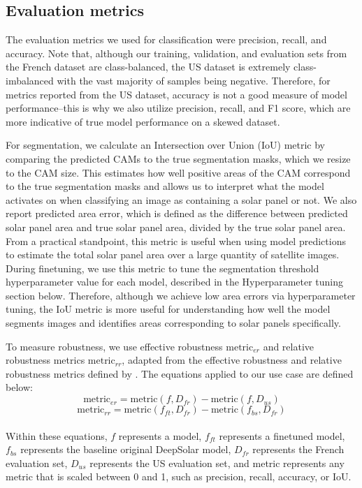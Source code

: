 \documentclass[10pt,twocolumn,letterpaper]{article}
\begin{document}
\subsection{Evaluation metrics}

The evaluation metrics we used for classification were precision, recall, and accuracy. Note that, although our training, validation, and evaluation sets from the French dataset are class-balanced, the US dataset is extremely class-imbalanced with the vast majority of samples being negative. Therefore, for metrics reported from the US dataset, accuracy is not a good measure of model performance--this is why we also utilize precision, recall, and F1 score, which are more indicative of true model performance on a skewed dataset. 

For segmentation, we calculate an Intersection over Union (IoU) metric by comparing the predicted CAMs to the true segmentation masks, which we resize to the CAM size. This estimates how well positive areas of the CAM correspond to the true segmentation masks and allows us to interpret what the model activates on when classifying an image as containing a solar panel or not. We also report predicted area error, which is defined as the difference between predicted solar panel area and true solar panel area, divided by the true solar panel area. From a practical standpoint, this metric is useful when using model predictions to estimate the total solar panel area over a large quantity of satellite images. During finetuning, we use this metric to tune the segmentation threshold hyperparameter value for each model, described in the Hyperparameter tuning section below. Therefore, although we achieve low area errors via hyperparameter tuning, the IoU metric is more useful for understanding how well the model segments images and identifies areas corresponding to solar panels specifically.

To measure robustness, we use effective robustness $\text{metric}_{er}$ and relative robustness metrics $\text{metric}_{rr}$, adapted from the effective robustness and relative robustness metrics defined by \cite{Taori2020}. The equations applied to our use case are defined below: 
\begin{equation}
\text{metric}_{er} = \text{metric}(f, D_{fr}) - \text{metric}(f, D_{us})
\end{equation}
\begin{equation}
\text{metric}_{rr} = \text{metric}(f_{ft}, D_{fr}) - \text{metric}(f_{bs}, D_{fr})
\end{equation} \\
Within these equations, $f$ represents a model, $f_{ft}$ represents a finetuned model, $f_{bs}$ represents the baseline original DeepSolar model, $D_{fr}$ represents the French evaluation set, $D_{us}$ represents the US evaluation set, and metric represents any metric that is scaled between 0 and 1, such as precision, recall, accuracy, or IoU. 
\end{document}

